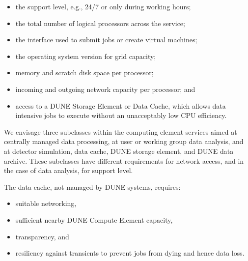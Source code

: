 \documentclass[../main-v1.tex]{subfiles}
\begin{document}
{\begin{itemize}
    \item %
    the support level, e.g., 24/7 or only during working hours;
    \item the total number of logical processors across the service;
    \item the interface used to submit jobs or create virtual machines;
    \item the operating system version for grid capacity;
    \item memory and scratch disk space per processor;
    \item incoming and outgoing network capacity per processor; and
    \item %
    access to a DUNE Storage Element or Data Cache, which allows data intensive jobs to execute without an unacceptably low CPU efficiency.
\end{itemize}

We envisage three subclasses within the computing element services aimed at centrally managed data processing, at user or working group data analysis, and at detector simulation, data cache, DUNE storage element, and DUNE data archive. These subclasses have different requirements for network access, and in the case of data analysis, for support level.

The data cache, not managed by DUNE systems, requires:
\begin{itemize}
\item suitable networking,
\item sufficient nearby DUNE Compute Element capacity,
\item transparency, and
\item resiliency against transients to prevent jobs from dying and hence data loss.
\end{itemize}


}
\end{document}
